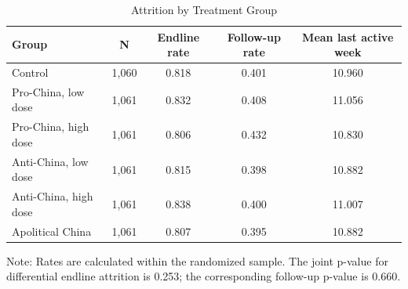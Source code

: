 \begin{table}[H]
\centering
\caption{Attrition by Treatment Group}
\label{tab:attrition}
\footnotesize
\begin{threeparttable}
\begin{tabular}{lcccc}
\toprule
Group & N & Endline rate & Follow-up rate & Mean last active week \\
\midrule
Control & 1,060 & 0.818 & 0.401 & 10.960 \\
Pro-China, low dose & 1,061 & 0.832 & 0.408 & 11.056 \\
Pro-China, high dose & 1,061 & 0.806 & 0.432 & 10.830 \\
Anti-China, low dose & 1,061 & 0.815 & 0.398 & 10.882 \\
Anti-China, high dose & 1,061 & 0.838 & 0.400 & 11.007 \\
Apolitical China & 1,061 & 0.807 & 0.395 & 10.882 \\
\bottomrule
\end{tabular}
\begin{tablenotes}[flushleft]
\footnotesize
\item Note: Rates are calculated within the randomized sample. The joint p-value for differential endline attrition is 0.253; the corresponding follow-up p-value is 0.660.
\end{tablenotes}
\end{threeparttable}
\end{table}
